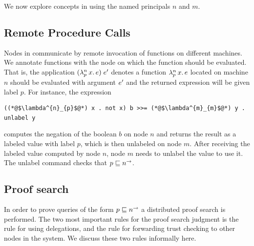 We now explore concepts in \lang{} using the named principals $n$ and $m$.

\subsection{Remote Procedure Calls}
Nodes in \lang{} communicate by remote invocation of functions on different machines. We annotate functions with the node on which the function should be evaluated. That is, the application $(\lambda^{n}_{p}\,x.\,e)\;e'$ denotes a function $\lambda^{n}_{p}\,x.\,e$ located on machine $n$ should be evaluated with argument $e'$ and the returned expression will be given label $p$. For instance, the expression
\begin{lstlisting}
((*@$\lambda^{n}_{p}$@*) x . not x) b >>= (*@$\lambda^{m}_{m}$@*) y . unlabel y
\end{lstlisting}
computes the negation of the boolean $b$ on node $n$ and returns the result as a labeled value with label $p$, which is then unlabeled on node $m$. After receiving the labeled value computed by node $n$, node $m$ needs to unlabel the value to use it. The unlabel command checks that $p \sqsubseteq n^{\rightarrow}$.

\subsection{Proof search}
In order to prove queries of the form $p \sqsubseteq n^{\rightarrow}$ a distributed proof search is performed. The two most important rules for the proof search judgment is the rule for using delegations, and the rule for forwarding trust checking to other nodes in the system. We discuss these two rules informally here.

